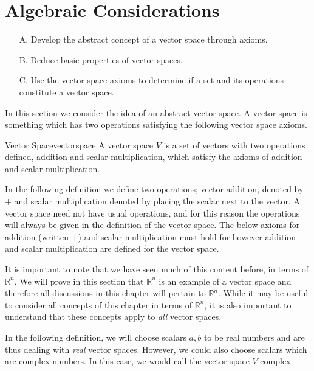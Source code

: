 \section{Algebraic Considerations}

\begin{outcome}
\begin{enumerate}
\item[A.] Develop the abstract concept of a vector space through axioms.

\item[B.] Deduce basic properties of vector spaces.

\item[C.]  Use the vector space axioms to determine if a set and its operations constitute a vector space.
\end{enumerate}
\end{outcome}

In this section we consider the idea of an abstract vector space. A vector space is
something which has two operations satisfying the following vector space
axioms.

\begin{definition}{Vector Space}{vectorspace}
A vector space $V$  is a set of vectors with two operations defined, addition and scalar multiplication, which satisfy the axioms of addition and scalar multiplication. 
\end{definition}

 In the following definition we define two operations; vector addition, denoted by $+$ and scalar
multiplication denoted by placing the scalar next to the vector. A vector space need not have usual operations, and for this reason the operations will always be given in the definition of the vector space. The below axioms for addition (written +) and scalar multiplication must hold for however addition and scalar multiplication are defined for the vector space.  

It is important to note that we have seen much of this content before, in terms of $\mathbb{R}^n$. We will prove in this section that $\mathbb{R}^n$ is an example of a vector space and therefore all discussions in this chapter will pertain to $\mathbb{R}^n$. While it may be useful to consider all concepts of this chapter in terms of $\mathbb{R}^n$, it is also important to understand that these concepts apply to \textit{all} vector spaces. 

In the following definition, we will choose scalars $a,b$ to be real numbers and are thus dealing with \textit{real} vector spaces. However, we could also choose scalars which are complex numbers. In this case, we would call the vector space $V$ complex. 

